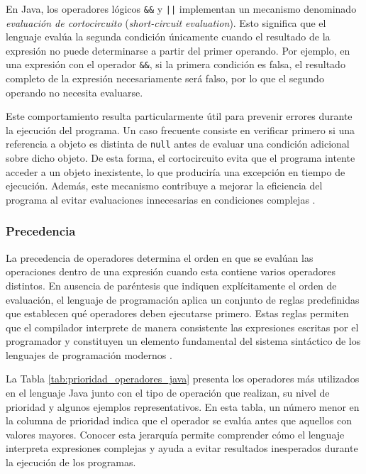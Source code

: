 \documentclass[12pt,twoside]{book}
\begin{document}
					\noindent
					En Java, los operadores lógicos \texttt{\&\&} y \texttt{||} implementan un mecanismo denominado \textit{evaluación de cortocircuito} (\textit{short-circuit evaluation}). Esto significa que el lenguaje evalúa la segunda condición únicamente cuando el resultado de la expresión no puede determinarse a partir del primer operando. Por ejemplo, en una expresión con el operador \texttt{\&\&}, si la primera condición es falsa, el resultado completo de la expresión necesariamente será falso, por lo que el segundo operando no necesita evaluarse.
					
					Este comportamiento resulta particularmente útil para prevenir errores durante la ejecución del programa. Un caso frecuente consiste en verificar primero si una referencia a objeto es distinta de \texttt{null} antes de evaluar una condición adicional sobre dicho objeto. De esta forma, el cortocircuito evita que el programa intente acceder a un objeto inexistente, lo que produciría una excepción en tiempo de ejecución. Además, este mecanismo contribuye a mejorar la eficiencia del programa al evitar evaluaciones innecesarias en condiciones complejas \cite{Sebesta2018Concepts,Pressman2019Software}.

					\subsubsection{Precedencia}
						\noindent
						La precedencia de operadores determina el orden en que se evalúan las operaciones dentro de una expresión cuando esta contiene varios operadores distintos. En ausencia de paréntesis que indiquen explícitamente el orden de evaluación, el lenguaje de programación aplica un conjunto de reglas predefinidas que establecen qué operadores deben ejecutarse primero. Estas reglas permiten que el compilador interprete de manera consistente las expresiones escritas por el programador y constituyen un elemento fundamental del sistema sintáctico de los lenguajes de programación modernos \cite{Sebesta2018Concepts,Pierce2002Types}.
						
						La Tabla \ref{tab:prioridad_operadores_java} presenta los operadores más utilizados en el lenguaje Java junto con el tipo de operación que realizan, su nivel de prioridad y algunos ejemplos representativos. En esta tabla, un número menor en la columna de prioridad indica que el operador se evalúa antes que aquellos con valores mayores. Conocer esta jerarquía permite comprender cómo el lenguaje interpreta expresiones complejas y ayuda a evitar resultados inesperados durante la ejecución de los programas.
						
\end{document}
